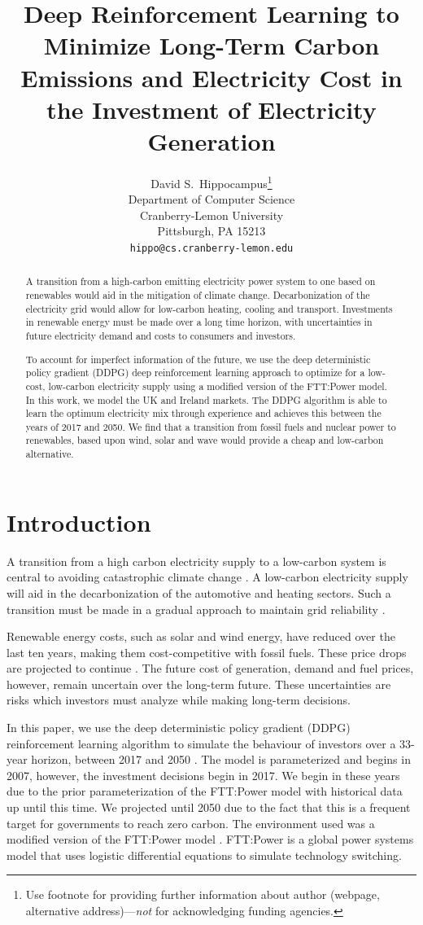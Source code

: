 \documentclass{article}
\title{Deep Reinforcement Learning to Minimize Long-Term Carbon Emissions and Electricity Cost in the Investment of Electricity Generation}
\author{%
  David S.~Hippocampus\thanks{Use footnote for providing further information
    about author (webpage, alternative address)---\emph{not} for acknowledging
    funding agencies.} \\
  Department of Computer Science\\
  Cranberry-Lemon University\\
  Pittsburgh, PA 15213 \\
  \texttt{hippo@cs.cranberry-lemon.edu} \\
}
\begin{document}
\maketitle

\begin{abstract}

A transition from a high-carbon emitting electricity power system to one based on renewables would aid in the mitigation of climate change. Decarbonization of the electricity grid would allow for low-carbon heating, cooling and transport. Investments in renewable energy must be made over a long time horizon, with uncertainties in future electricity demand and costs to consumers and investors. 

To account for imperfect information of the future, we use the deep deterministic policy gradient (DDPG) deep reinforcement learning approach to optimize for a low-cost, low-carbon electricity supply using a modified version of the FTT:Power model. In this work, we model the UK and Ireland markets. The DDPG algorithm is able to learn the optimum electricity mix through experience and achieves this between the years of 2017 and 2050. We find that a transition from fossil fuels and nuclear power to renewables, based upon wind, solar and wave would provide a cheap and low-carbon alternative.

\end{abstract}




\section{Introduction}
\label{sec:intro}


A transition from a high carbon electricity supply to a low-carbon system is central to avoiding catastrophic climate change \cite{Kell2020}. A low-carbon electricity supply will aid in the decarbonization of the automotive and heating sectors. Such a transition must be made in a gradual approach to maintain grid reliability \cite{Kahrl2011}.

Renewable energy costs, such as solar and wind energy, have reduced over the last ten years, making them cost-competitive with fossil fuels. These price drops are projected to continue \cite{IEA2015}. The future cost of generation, demand and fuel prices, however, remain uncertain over the long-term future. These uncertainties are risks which investors must analyze while making long-term decisions.

In this paper, we use the deep deterministic policy gradient (DDPG) reinforcement learning algorithm to simulate the behaviour of investors over a 33-year horizon, between 2017 and 2050 \cite{Hunt2016a}. The model is parameterized and begins in 2007, however, the investment decisions begin in 2017. We begin in these years due to the prior parameterization of the FTT:Power model with historical data up until this time. We projected until 2050 due to the fact that this is a frequent target for governments to reach zero carbon. The environment used was a modified version of the FTT:Power model \cite{Mercure2012}. FTT:Power is a global power systems model that uses logistic differential equations to simulate technology switching. 
\end{document}
